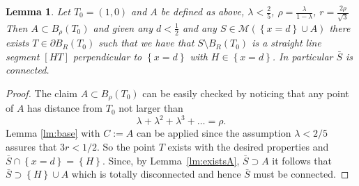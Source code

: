 \documentclass{amsart}
\newcommand{\ENCLOSE}[1]{\left\{#1\right\}}
\newcommand{\M}{\mathcal{M}}
\newtheorem{lemma}[theorem]{Lemma}
\theoremstyle{definition}
\theoremstyle{remark}
\begin{document}
\begin{lemma}\label{lm:01}
  Let $T_0=(1,0)$ and $A$ be defined as above,
  $\lambda < \frac 2 5$,
  $\rho= \frac{\lambda}{1-\lambda}$,
  $r=\frac{2\rho}{\sqrt 3}$
  Then $A\subset B_\rho(T_0)$ and 
  given any $d<\frac 1 2$ and any
  $S\in \M(\ENCLOSE{x=d}\cup A)$ 
  there exists $T\in \partial B_R(T_0)$ such that
  we have that $S\setminus B_R(T_0)$ is a straight line segment
  $[HT]$ perpendicular to $\ENCLOSE{x=d}$ 
  with $H\in \ENCLOSE{x=d}$.
  In particular $\bar S$ is connected.
\end{lemma}
\begin{proof}
  The claim $A\subset B_\rho(T_0)$ can be easily checked
  by noticing that any point of $A$ has distance
  from $T_0$ not larger than 
  \[
      \lambda + \lambda^2 + \lambda^3 + \dots = \rho.
  \]
  Lemma \ref{lm:base} with $C:=A$ 
  can be applied since the assumption $\lambda < 2/5$ assures 
  that $3r < 1/2$.
  So the point $T$ exists with the desired properties and 
  $\bar S\cap \ENCLOSE{x=d} =\ENCLOSE{H}$.
  Since, by Lemma~\ref{lm:existsA}, $\bar S \supset A$
  it follows that $\bar S \supset \ENCLOSE{H}\cup A$ which is totally disconnected 
  and hence $\bar S$ must be connected.
\end{proof}
\end{document}
